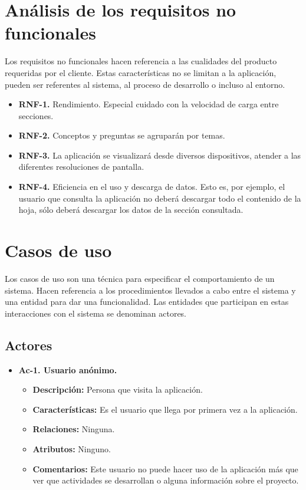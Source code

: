 \section{Análisis de los requisitos no funcionales}

Los requisitos no funcionales hacen referencia a las cualidades del producto requeridas por el cliente. Estas características no se limitan a la aplicación, pueden ser referentes al sistema, al proceso de desarrollo o incluso al entorno.

\begin{itemize}
  \item \textbf{RNF-1.} Rendimiento. Especial cuidado con la velocidad de carga entre secciones.
  \item \textbf{RNF-2.} Conceptos y preguntas se agruparán por temas.
  \item \textbf{RNF-3.}\label{rnf-3} La aplicación se visualizará desde diversos dispositivos, atender a las diferentes resoluciones de pantalla.
  \item \textbf{RNF-4.} Eficiencia en el uso y descarga de datos. Esto es, por ejemplo, el usuario que consulta la aplicación no deberá descargar todo el contenido de la hoja, sólo deberá descargar los datos de la sección consultada.
\end{itemize}


\section{Casos de uso}
	Los casos de uso son una técnica para especificar el comportamiento de un sistema. Hacen referencia a los procedimientos llevados a cabo entre el sistema y una entidad para dar una funcionalidad. Las entidades que participan en estas interacciones con el sistema se denominan actores.

\subsection{Actores}

	
\begin{itemize}
  \item \textbf{Ac-1. Usuario anónimo.}
  \begin{itemize}
   \item \textbf{Descripción:} Persona que visita la aplicación.
   \item \textbf{Características:} Es el usuario que llega por primera vez a la aplicación.
   \item \textbf{Relaciones:} Ninguna.
   \item \textbf{Atributos:} Ninguno.
   \item \textbf{Comentarios:} Este usuario no puede hacer uso de la aplicación más que ver que actividades se desarrollan o alguna información sobre el proyecto.
  \end{itemize}
\end{itemize}

